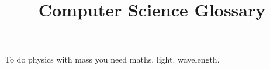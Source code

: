 \documentclass{article}
\title{Computer Science Glossary}
\author{ }
\date{ }
\begin{document}
\maketitle
 
To do physics with \Gls{mass} you need \gls{maths}. 
 \gls{light}. 
  \gls{wavelength}. 
 
\clearpage
 
\printglossaries
 
\end{document}
